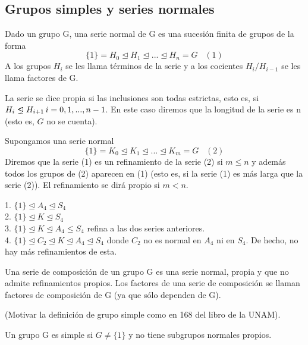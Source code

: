 \subsection{Grupos simples y series normales}

\begin{ndef}
Dado un grupo G, una serie normal de G es una sucesión finita de grupos de la forma $$\{1\} = H_0 \trianglelefteq H_1 \trianglelefteq ... \trianglelefteq H_n = G \;\;\;(1)$$ A los grupos $H_i$ se les llama términos de la serie y a los cocientes $H_i/H_{i-1}$ se les llama factores de G.

La serie se dice propia si las inclusiones son todas estrictas, esto es, si $H_i \propernormal H_{i+1} \, i = 0,1,...,n-1$. En este caso diremos que la longitud  de la serie es n (esto es, $G$ no se cuenta).

Supongamos una serie normal $$\{1\} = K_0 \trianglelefteq K_1 \trianglelefteq ... \trianglelefteq K_m = G\;\;\;(2)$$ Diremos que la serie (1) es un refinamiento de la serie (2) si $m \le n$ y además todos los grupos de (2) aparecen en (1) (esto es, si la serie (1) es más larga que la serie (2)). El refinamiento se dirá propio si $m < n$.
\end{ndef}

\begin{ejemplo}
1. $\{1\} \trianglelefteq A_4 \trianglelefteq S_4$\\
2. $\{1\} \trianglelefteq K \trianglelefteq S_4$\\
3. $\{1\} \trianglelefteq K \trianglelefteq A_4 \le S_4$ refina a las dos series anteriores.\\
4. $\{1\} \trianglelefteq C_2 \trianglelefteq K \trianglelefteq A_4 \trianglelefteq S_4$ donde $C_2$ no es normal en $A_4$ ni en $S_4$. De hecho, no hay más refinamientos de esta.
\end{ejemplo}

\begin{ndef}
Una serie de composición de un grupo G es una serie normal, propia y que no admite refinamientos propios. Los factores de una serie de composición se llaman factores de composición de G (ya que sólo dependen de G).
\end{ndef}

(Motivar la definición de grupo simple como en 168 del libro de la UNAM).

\begin{ndef}
Un grupo G es simple si $G \neq \{1\}$ y no tiene subgrupos normales propios.
\end{ndef}

